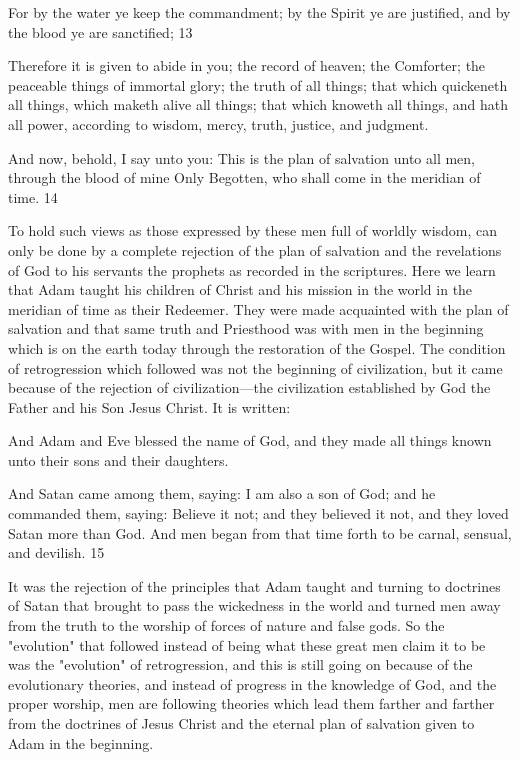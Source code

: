 For by the water ye keep the commandment; by the Spirit ye are justified, and by the blood
ye are sanctified; 13

Therefore it is given to abide in you; the record of heaven; the Comforter; the peaceable
things of immortal glory; the truth of all things; that which quickeneth all things, which
maketh alive all things; that which knoweth all things, and hath all power, according to
wisdom, mercy, truth, justice, and judgment.

And now, behold, I say unto you: This is the plan of salvation unto all men, through the
blood of mine Only Begotten, who shall come in the meridian of time. 14

To hold such views as those expressed by these men full of worldly wisdom, can only be
done by a complete rejection of the plan of salvation and the revelations of God to his
servants the prophets as recorded in the scriptures. Here we learn that Adam taught his
children of Christ and his mission in the world in the meridian of time as their Redeemer.
They were made acquainted with the plan of salvation and that same truth and Priesthood
was with men in the beginning which is on the earth today through the restoration of the
Gospel. The condition of retrogression which followed was not the beginning of civilization,
but it came because of the rejection of civilization—the civilization established by God the
Father and his Son Jesus Christ. It is written:

And Adam and Eve blessed the name of God, and they made all things known unto their sons
and their daughters.

And Satan came among them, saying: I am also a son of God; and he commanded them,
saying: Believe it not; and they believed it not, and they loved Satan more than God. And
men began from that time forth to be carnal, sensual, and devilish. 15

It was the rejection of the principles that Adam taught and turning to doctrines of Satan that
brought to pass the wickedness in the world and turned men away from the truth to the
worship of forces of nature and false gods. So the "evolution" that followed instead of being
what these great men claim it to be was the "evolution" of retrogression, and this is still going
on because of the evolutionary theories, and instead of progress in the knowledge of God,
and the proper worship, men are following theories which lead them farther and farther from
the doctrines of Jesus Christ and the eternal plan of salvation given to Adam in the
beginning.

